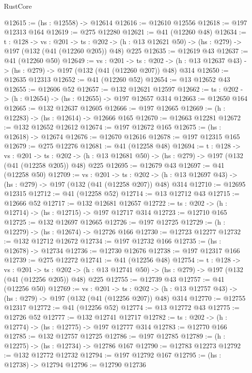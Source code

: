 \begin{lexlean}{RustCore}
\begin{coremodule}
@12615 := (hs : @12558) -> @12614
@12616 := @12610 @12556
@12618 := @197 @12313 @164
@12619 := @275 @12280
@12621 := @41 (@12260 @48)
@12634 := {t : @128} ->
  {vs : @201} ->
  {ts : @202} -> (h : @13 @12621 @50) -> (hs : @279) -> @197 (@132 (@41 (@12260 @205)) @48) @225
@12635 := @12619 @43
@12637 := @41 (@12260 @50)
@12649 := {vs : @201} ->
  {ts : @202} -> (h : @13 @12637 @43) -> (hs : @279) -> @197 (@132 (@41 (@12260 @207)) @48) @314
@12650 := @12635 @12313
@12652 := @41 (@12260 @52)
@12654 := @13 @12652 @43
@12655 := @12606 @52
@12657 := @132 @12621 @12597
@12662 := {ts : @202} -> (h : @12654) -> (hs : @12655) -> @197 @12657 @314
@12663 := @12650 @164
@12665 := @132 @12637 @12605
@12666 := @197 @12665
@12669 := (h : @12283) -> (hs : @12614) -> @12666 @165
@12670 := @12663 @12281
@12672 := @132 @12652 @12612
@12674 := @197 @12672 @165
@12675 := (hs : @12618) -> @12674
@12676 := @12670 @12616
@12678 := @197 @12315 @165
@12679 := @275 @12276
@12681 := @41 (@12258 @48)
@12694 := {t : @128} ->
  {vs : @201} ->
  {ts : @202} -> (h : @13 @12681 @50) -> (hs : @279) -> @197 (@132 (@41 (@12258 @205)) @48) @225
@12695 := @12679 @43
@12697 := @41 (@12258 @50)
@12709 := {vs : @201} ->
  {ts : @202} -> (h : @13 @12697 @43) -> (hs : @279) -> @197 (@132 (@41 (@12258 @207)) @48) @314
@12710 := @12695 @12315
@12712 := @41 (@12258 @52)
@12714 := @13 @12712 @43
@12715 := @12666 @52
@12717 := @132 @12681 @12657
@12722 := {ts : @202} -> (h : @12714) -> (hs : @12715) -> @197 @12717 @314
@12723 := @12710 @165
@12725 := @132 @12697 @12665
@12726 := @197 @12725
@12729 := (h : @12279) -> (hs : @12674) -> @12726 @166
@12730 := @12723 @12277
@12732 := @132 @12712 @12672
@12734 := @197 @12732 @166
@12735 := (hs : @12678) -> @12734
@12736 := @12730 @12676
@12738 := @197 @12317 @166
@12739 := @275 @12272
@12741 := @41 (@12256 @48)
@12754 := {t : @128} ->
  {vs : @201} ->
  {ts : @202} -> (h : @13 @12741 @50) -> (hs : @279) -> @197 (@132 (@41 (@12256 @205)) @48) @225
@12755 := @12739 @43
@12757 := @41 (@12256 @50)
@12769 := {vs : @201} ->
  {ts : @202} -> (h : @13 @12757 @43) -> (hs : @279) -> @197 (@132 (@41 (@12256 @207)) @48) @314
@12770 := @12755 @12317
@12772 := @41 (@12256 @52)
@12774 := @13 @12772 @43
@12775 := @12726 @52
@12777 := @132 @12741 @12717
@12782 := {ts : @202} -> (h : @12774) -> (hs : @12775) -> @197 @12777 @314
@12783 := @12770 @166
@12785 := @132 @12757 @12725
@12786 := @197 @12785
@12789 := (h : @12275) -> (hs : @12734) -> @12786 @167
@12790 := @12783 @12273
@12792 := @132 @12772 @12732
@12794 := @197 @12792 @167
@12795 := (hs : @12738) -> @12794
@12796 := @12790 @12736

\end{coremodule}
\end{lexlean}
